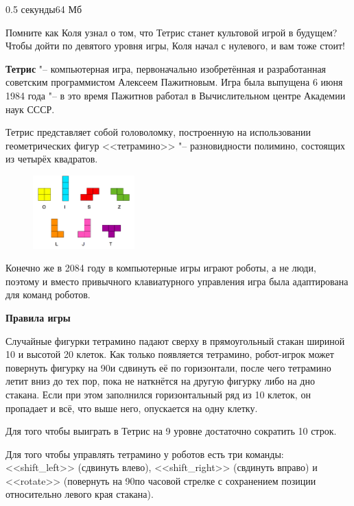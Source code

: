 \begin{problem}{}{}{}{0.5 секунды}{64 Мб}

Помните как Коля узнал о том, что Тетрис станет культовой игрой в будущем? Чтобы дойти по девятого
уровня игры, Коля начал с нулевого, и вам тоже стоит!

{\bf {Тетрис}} "-- компьютерная игра, первоначально изобретённая и разработанная советским
программистом Алексеем Пажитновым. Игра была выпущена 6 июня 1984 года "-- в это время Пажитнов
работал в Вычислительном центре Академии наук СССР.

Тетрис представляет собой головоломку, построенную на использовании геометрических фигур
<<тетрамино>> "-- разновидности полимино, состоящих из четырёх квадратов.

\begin{figure}
\vspace{-20pt}
  \begin{center}
    \includegraphics[width=0.35\textwidth,natwidth=267,natheight=200]{tetromino.png}
  \end{center}
  \vspace{-20pt}
  \vspace{1pt}
\end{figure}

Конечно же в 2084 году в компьютерные игры играют роботы, а не люди, поэтому и вместо
привычного клавиатурного управления игра была адаптирована для команд роботов.

{\bf {Правила игры}}

Случайные фигурки тетрамино падают сверху в прямоугольный стакан шириной 10 и высотой 20 клеток.
Как только появляется тетрамино, робот-игрок может повернуть фигурку на 90\textdegree и сдвинуть её
по горизонтали, после чего тетрамино летит вниз до тех пор, пока не наткнётся на другую фигурку
либо на дно стакана. Если при этом заполнился горизонтальный ряд из 10 клеток, он пропадает и всё,
что выше него, опускается на одну клетку.

Для того чтобы выиграть в Тетрис на 9 уровне достаточно сократить 10 строк.

Для того чтобы управлять тетрамино у роботов есть три команды: <<shift_left>> (сдвинуть влево),
<<shift_right>> (свдинуть вправо) и <<rotate>> (повернуть на 90\textdegree по часовой стрелке с
сохранением позиции относительно левого края стакана).


\end{problem}
